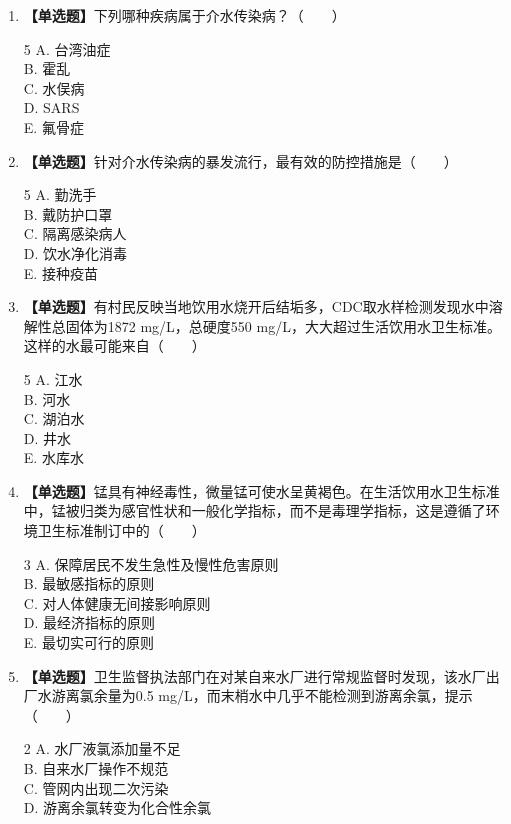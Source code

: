 \begin{enumerate}[leftmargin=*, itemsep=8pt]
    \item \textbf{【单选题】}下列哪种疾病属于介水传染病？（~~~~）
    \begin{multicols}{5}
    A. 台湾油症 \\
    B. 霍乱 \\
    C. 水俣病 \\
    D. SARS \\
    E. 氟骨症
    \end{multicols}
    \item \textbf{【单选题】}针对介水传染病的暴发流行，最有效的防控措施是（~~~~）
    \begin{multicols}{5}
    A. 勤洗手 \\
    B. 戴防护口罩 \\
    C. 隔离感染病人 \\
    D. 饮水净化消毒 \\
    E. 接种疫苗
    \end{multicols}
    \item \textbf{【单选题】}有村民反映当地饮用水烧开后结垢多，CDC取水样检测发现水中溶解性总固体为1872 mg/L，总硬度550 mg/L，大大超过生活饮用水卫生标准。这样的水最可能来自（~~~~）
    \begin{multicols}{5}
    A. 江水 \\
    B. 河水 \\
    C. 湖泊水 \\
    D. 井水 \\
    E. 水库水
    \end{multicols}
    \item \textbf{【单选题】}锰具有神经毒性，微量锰可使水呈黄褐色。在生活饮用水卫生标准中，锰被归类为感官性状和一般化学指标，而不是毒理学指标，这是遵循了环境卫生标准制订中的（~~~~）
    \begin{multicols}{3}
    A. 保障居民不发生急性及慢性危害原则 \\
    B. 最敏感指标的原则 \\
    C. 对人体健康无间接影响原则 \\
    D. 最经济指标的原则 \\
    E. 最切实可行的原则
    \end{multicols}
    \item \textbf{【单选题】}卫生监督执法部门在对某自来水厂进行常规监督时发现，该水厂出厂水游离氯余量为0.5 mg/L，而末梢水中几乎不能检测到游离余氯，提示（~~~~）
    \begin{multicols}{2}
    A. 水厂液氯添加量不足 \\
    B. 自来水厂操作不规范 \\
    C. 管网内出现二次污染 \\
    D. 游离余氯转变为化合性余氯
    \end{multicols}
\end{enumerate}

